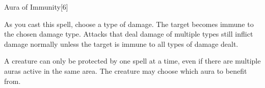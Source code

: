 \begin{spellsection}{Aura of Immunity}[6]
    \begin{spellheader}
    \end{spellheader}
    \begin{spellcontent}
        \begin{spelltargetinginfo}
        \end{spelltargetinginfo}
        \begin{spelleffects}
            \spellspecial As you cast this spell, choose a type of damage.
            \spelleffect The target becomes immune to the chosen damage type. Attacks that deal damage of multiple types still inflict damage normally unless the target is immune to all types of damage dealt.
            \spelldur \durshort
        \end{spelleffects}
    \end{spellcontent}
    \begin{spellfooter}
        \spellnotes A creature can only be protected by one  spell at a time, even if there are multiple auras active in the same area. The creature may choose which aura to benefit from.
        \miscastexplode
    \end{spellfooter}
\end{spellsection}

